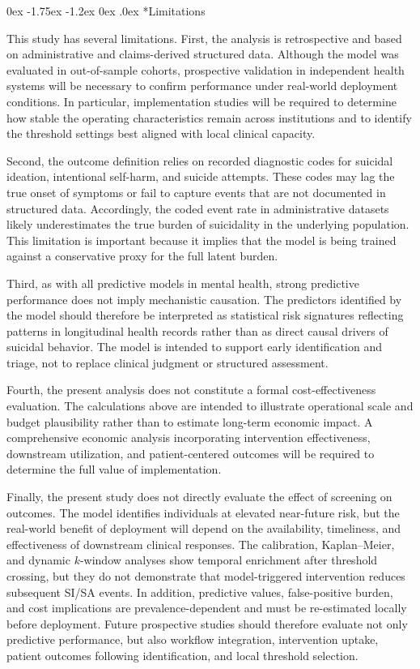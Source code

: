 \documentclass[onecolumn, compsoc,11pt]{IEEEtran}
\makeatletter
\renewcommand\subsection{\@startsection {subsection}{2}{\z@}
  {0ex \@plus -1.75ex \@minus -1.2ex}
  {0ex \@plus.0ex}
  {\fontsize{11}{11}\selectfont\bfseries\sffamily}}
\makeatother
\begin{document}
\subsection*{Limitations}

This study has several limitations. First, the analysis is retrospective and based on administrative and claims-derived structured data. Although the model was evaluated in out-of-sample cohorts, prospective validation in independent health systems will be necessary to confirm performance under real-world deployment conditions. In particular, implementation studies will be required to determine how stable the operating characteristics remain across institutions and to identify the threshold settings best aligned with local clinical capacity.

Second, the outcome definition relies on recorded diagnostic codes for suicidal ideation, intentional self-harm, and suicide attempts. These codes may lag the true onset of symptoms or fail to capture events that are not documented in structured data. Accordingly, the coded event rate in administrative datasets likely underestimates the true burden of suicidality in the underlying population. This limitation is important because it implies that the model is being trained against a conservative proxy for the full latent burden.

Third, as with all predictive models in mental health, strong predictive performance does not imply mechanistic causation. The predictors identified by the model should therefore be interpreted as statistical risk signatures reflecting patterns in longitudinal health records rather than as direct causal drivers of suicidal behavior. The model is intended to support early identification and triage, not to replace clinical judgment or structured assessment.

Fourth, the present analysis does not constitute a formal cost-effectiveness evaluation. The calculations above are intended to illustrate operational scale and budget plausibility rather than to estimate long-term economic impact. A comprehensive economic analysis incorporating intervention effectiveness, downstream utilization, and patient-centered outcomes will be required to determine the full value of implementation.

Finally, the present study does not directly evaluate the effect of screening on outcomes. The model identifies individuals at elevated near-future risk, but the real-world benefit of deployment will depend on the availability, timeliness, and effectiveness of downstream clinical responses. The calibration, Kaplan--Meier, and dynamic \(k\)-window analyses show temporal enrichment after threshold crossing, but they do not demonstrate that model-triggered intervention reduces subsequent SI/SA events. In addition, predictive values, false-positive burden, and cost implications are prevalence-dependent and must be re-estimated locally before deployment. Future prospective studies should therefore evaluate not only predictive performance, but also workflow integration, intervention uptake, patient outcomes following identification, and local threshold selection.
\end{document}
